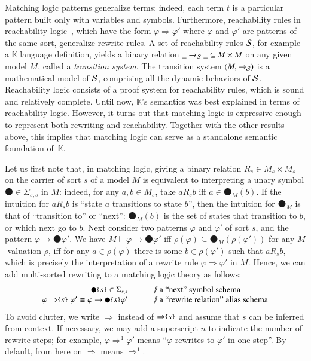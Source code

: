 \documentclass[UTF8,11pt]{article}
\theoremstyle{plain}
\theoremstyle{definition}
\theoremstyle{remark}
\newcommand{\K}{\mbox{$\mathbb{K}$}\xspace}
\newcommand{\snext}{{\medbullet}}
\newcommand{\parametric}[2]{{#1}\raisebox{.2ex}{\texttt{\footnotesize{\{}}}#2\raisebox{.2ex}{\texttt{\footnotesize{\}}}}}
\newcommand{\doubleslash}{/\!/{ }}
\newcommand{\ra}{\rightarrow}
\begin{document}
Matching logic patterns generalize terms: indeed, each term $t$ is a
particular pattern built only with variables and symbols.
Furthermore, reachability rules in reachability
logic~\cite{rosu-stefanescu-ciobaca-moore-2013-lics,stefanescu-ciobaca-mereuta-moore-serbanuta-rosu-2014-rta},
which have the form $\varphi \Rightarrow \varphi'$ where $\varphi$ and $\varphi'$
are patterns of the same sort, generalize rewrite rules.
A set of reachability rules $\cal S$, for example a \K language
definition, yields a binary relation $\_\ra_{\cal S}\_ \subseteq M \times M$
on any given model $M$, called a \emph{transition system}.
The transition system $(M,\ra_{\cal S})$ is a mathematical model of $\cal S$,
comprising all the dynamic behaviors of $\cal S$.
Reachability logic consists of a proof system for reachability rules,
which is sound and relatively complete.
Until now, \K's semantics was best explained in terms of reachability logic.
However, it turns out that matching logic is expressive enough to represent
both rewriting and reachability.
Together with the other results above, this implies that matching
logic can serve as a standalone semantic foundation of~$\K$.

Let us first note that, in matching logic, giving a binary relation
$R_s \in M_s \times M_s$ on the carrier of sort $s$ of a model $M$
is equivalent to interpreting a unary symbol $\snext \in \Sigma_{s,s}$ in $M$:
indeed, for any $a,b\in M_s$, take $a\mathrel{R_s} b$ iff $a \in \snext_M(b)$.
If the intuition for $a \mathrel{R_s} b$ is ``state $a$ transitions to
state $b$'', then the intuition for $\snext_M$ is that of ``transition to''
or ``next'':
$\snext_M(b)$ is the set of states that transition to $b$, or which next go
to $b$.
Next consider two patterns $\varphi$ and $\varphi'$ of sort $s$, and the
pattern $\varphi \ra \snext \varphi'$.
We have $M \models \varphi \ra \snext \varphi'$ iff
$\overline{\rho}(\varphi) \subseteq \snext_M(\overline{\rho}(\varphi'))$
for any $M$-valuation $\rho$, iff for any $a\in\overline{\rho}(\varphi)$
there is some $b \in \overline{\rho}(\varphi')$ such that $a\mathrel{R_s}b$,
which is precisely the interpretation of a rewrite rule
$\varphi \Rightarrow \varphi'$ in $M$.
Hence, we can add multi-sorted rewriting to a matching logic theory
as follows:
$$
\begin{array}{r@{\hspace*{7ex}}l}
\parametric{\snext}{s} \in \Sigma_{s,s}
& \textrm{\doubleslash a ``next'' symbol schema}
\\
\varphi\mathrel{\parametric{\Rightarrow}{s}}\varphi'
\equiv \varphi \rightarrow \parametric{\snext}{s} \varphi'
& \textrm{\doubleslash a ``rewrite relation'' alias schema}
\end{array}
$$
To avoid clutter, we write $\Rightarrow$ instead of
$\parametric{\Rightarrow}{s}$ and assume that $s$ can be inferred from
context.
If necessary, we may add a superscript $n$ to indicate the number of rewrite steps;
for example, $\varphi \Rightarrow^1 \varphi'$ means
``$\varphi$ rewrites to $\varphi'$ in one step''.
By default, from here on $\Rightarrow$ means $\Rightarrow^1$.
\end{document}
